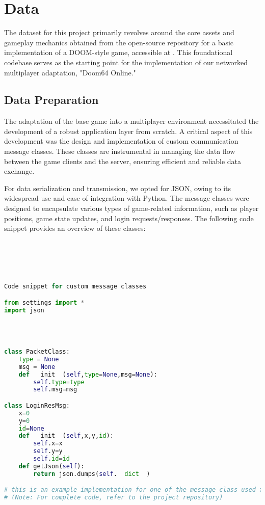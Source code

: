 \section{Data}
\label{chap:data}

The dataset for this project primarily revolves around the core assets and gameplay mechanics obtained from the open-source repository for a basic implementation of a DOOM-style game, accessible at \cite{doom-repo}. This foundational codebase serves as the starting point for the implementation of our networked multiplayer adaptation, "Doom64 Online."

\subsection{Data Preparation}
\label{sec:data preparation}

The adaptation of the base game into a multiplayer environment necessitated the development of a robust application layer from scratch. A critical aspect of this development was the design and implementation of custom communication message classes. These classes are instrumental in managing the data flow between the game clients and the server, ensuring efficient and reliable data exchange.

For data serialization and transmission, we opted for JSON, owing to its widespread use and ease of integration with Python. The message classes were designed to encapsulate various types of game-related information, such as player positions, game state updates, and login requests/responses. The following code snippet provides an overview of these classes:

\begin{lstlisting}[language=Python]





Code snippet for custom message classes

from settings import *
import json




class PacketClass:
    type = None
    msg = None
    def   init  (self,type=None,msg=None):
        self.type=type
        self.msg=msg

class LoginResMsg:
	x=0
	y=0
	id=None
	def   init  (self,x,y,id):
		self.x=x
		self.y=y
		self.id=id
	def getJson(self):
		return json.dumps(self.  dict  )

# this is an example implementation for one of the message class used for login
# (Note: For complete code, refer to the project repository)

\end{lstlisting}


